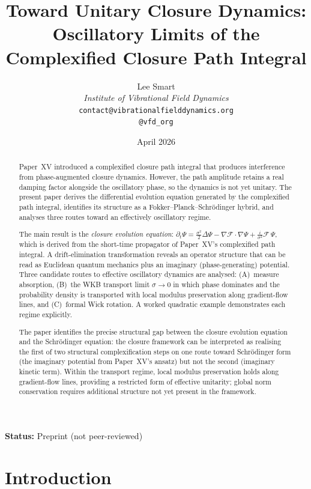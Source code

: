 \documentclass[12pt]{article}
\title{Toward Unitary Closure Dynamics:\\Oscillatory Limits of the Complexified Closure Path Integral}
\author{%
  Lee Smart\\[4pt]
  \textit{Institute of Vibrational Field Dynamics}\\[2pt]
  \texttt{contact@vibrationalfielddynamics.org}\\[2pt]
  \texttt{@vfd\_org}%
}
\date{April 2026}
\newcommand{\Fcal}{\mathcal{F}}
\begin{document}
\maketitle

\noindent\textbf{Status:} Preprint (not peer-reviewed)

\begin{abstract}
Paper~XV introduced a complexified closure path integral that produces interference from phase-augmented closure dynamics. However, the path amplitude retains a real damping factor alongside the oscillatory phase, so the dynamics is not yet unitary. The present paper derives the differential evolution equation generated by the complexified path integral, identifies its structure as a Fokker--Planck--Schr\"odinger hybrid, and analyses three routes toward an effectively oscillatory regime.

The main result is the \textit{closure evolution equation}: $\partial_t \Psi = \tfrac{\sigma^2}{2}\Delta\Psi - \nabla\Fcal \cdot \nabla\Psi + \tfrac{i}{\sigma^2}\Fcal\,\Psi$, which is derived from the short-time propagator of Paper~XV's complexified path integral. A drift-elimination transformation reveals an operator structure that can be read as Euclidean quantum mechanics plus an imaginary (phase-generating) potential. Three candidate routes to effective oscillatory dynamics are analysed: (A)~measure absorption, (B)~the WKB transport limit $\sigma \to 0$ in which phase dominates and the probability density is transported with local modulus preservation along gradient-flow lines, and (C)~formal Wick rotation. A worked quadratic example demonstrates each regime explicitly.

The paper identifies the precise structural gap between the closure evolution equation and the Schr\"odinger equation: the closure framework can be interpreted as realising the first of two structural complexification steps on one route toward Schr\"odinger form (the imaginary potential from Paper~XV's ansatz) but not the second (imaginary kinetic term). Within the transport regime, local modulus preservation holds along gradient-flow lines, providing a restricted form of effective unitarity; global norm conservation requires additional structure not yet present in the framework.
\end{abstract}

\section{Introduction}\label{sec:intro}
\end{document}
